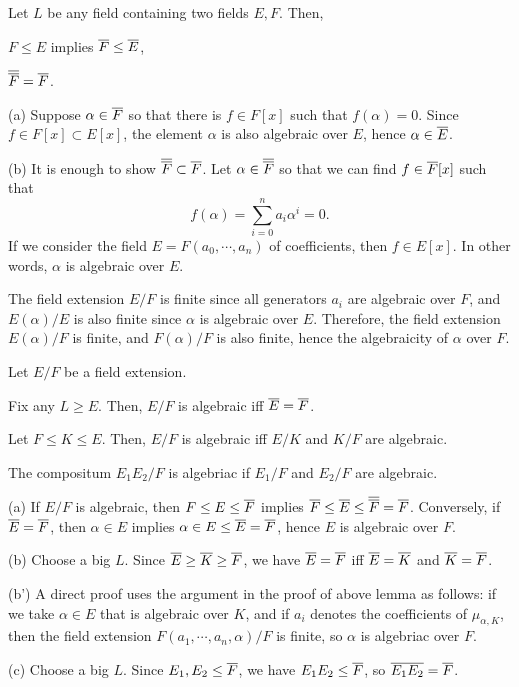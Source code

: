 \documentclass{../note}
\begin{document}
\begin{lem}
Let $L$ be any field containing two fields $E,F$.
Then,
\begin{parts}
\item $F\le E$ implies $\overline F\le \overline E$,
\item $\overline{\overline F}=\overline F$.
\end{parts}
\end{lem}
\begin{pf}
(a)
Suppose $\alpha\in\overline F$ so that there is $f\in F[x]$ such that $f(\alpha)=0$.
Since $f\in F[x]\subset E[x]$, the element $\alpha$ is also algebraic over $E$, hence $\alpha\in\overline E$.

(b)
It is enough to show $\overline{\overline F}\subset\overline F$.
Let $\alpha\in\overline{\overline F}$ so that we can find $f\in\overline F[x]$ such that
\[f(\alpha)=\sum_{i=0}^na_i\alpha^i=0.\]
If we consider the field $E=F(a_0,\cdots,a_n)$ of coefficients, then $f\in E[x]$.
In other words, $\alpha$ is algebraic over $E$.

The field extension $E/F$ is finite since all generators $a_i$ are algebraic over $F$, and $E(\alpha)/E$ is also finite since $\alpha$ is algebraic over $E$.
Therefore, the field extension $E(\alpha)/F$ is finite, and $F(\alpha)/F$ is also finite, hence the algebraicity of $\alpha$ over $F$.
\end{pf}

\begin{thm}
Let $E/F$ be a field extension.
\begin{parts}
\item Fix any $L\ge E$. Then, $E/F$ is algebraic iff $\overline E=\overline F$.
\item Let $F\le K\le E$. Then, $E/F$ is algebraic iff $E/K$ and $K/F$ are algebraic.
\item The compositum $E_1E_2/F$ is algebriac if $E_1/F$ and $E_2/F$ are algebraic.
\end{parts}
\end{thm}
\begin{pf}
(a)
If $E/F$ is algebraic, then $F\le E\le\overline F$ implies $\overline F\le\overline E\le\overline{\overline F}=\overline F$.
Conversely, if $\overline E=\overline F$, then $\alpha\in E$ implies $\alpha\in E\le\overline E=\overline F$, hence $E$ is algebraic over $F$.

(b)
Choose a big $L$.
Since $\overline E\ge\overline K\ge\overline F$, we have $\overline E=\overline F$ iff $\overline E=\overline K$ and $\overline K=\overline F$.

(b')
A direct proof uses the argument in the proof of above lemma as follows: if we take $\alpha\in E$ that is algebraic over $K$, and if $a_i$ denotes the coefficients of $\mu_{\alpha,K}$, then the field extension $F(a_1,\cdots,a_n,\alpha)/F$ is finite, so $\alpha$ is algebriac over $F$.

(c)
Choose a big $L$.
Since $E_1,E_2\le\overline F$, we have $E_1E_2\le\overline F$, so $\overline{E_1E_2}=\overline{F}$.
\end{pf}
\end{document}
